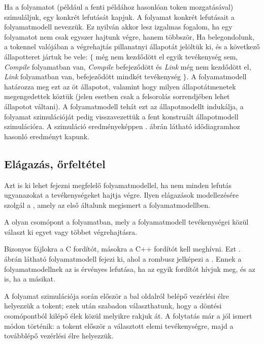 Ha a folyamatot (például a fenti példához hasonlóan token mozgatásával) szimuláljuk, egy konkrét lefutását kapjuk. A folyamat konkrét lefutásait a folyamatmodell  nevezzük. Ez nyilván akkor lesz izgalmas fogalom, ha egy folyamatot nem csak egyszer hajtunk végre, hanem többször,
Ha belegondolunk, a tokennel valójában a végrehajtás pillanatnyi állapotát jelöltük ki, és a következő állapotteret jártuk be vele: $\{$ még nem kezdődött el egyik tevékenység sem, \emph{Compile} folyamatban van, \emph{Compile} befejeződött és \emph{Link} még nem kezdődött el, \emph{Link} folyamatban van, befejeződött mindkét tevékenység $\}$. A folyamatmodell határozza meg ezt az öt állapotot, valamint hogy milyen állapotátmenetek megengedettek köztük (jelen esetben csak a felsorolás sorrendjében lehet állapotot váltani). A folyamatmodell tehát ezt az állapotmodellt indukálja, a folyamat szimulációját pedig visszavezettük a fent konstruált állapotmodell szimulációra. A szimuláció eredményeképpen . ábrán látható idődiagramhoz hasonló eredményt kapunk.



\subsection{Elágazás, őrfeltétel}
Azt is ki lehet fejezni megfelelő folyamatmodellel, ha nem minden lefutás ugyanazokat a tevékenységeket hajtja végre. Ilyen elágazások modellezésére szolgál a , amely az első általunk megismert  a folyamatmodellben.

\begin{definicio}
	A  olyan csomópont a folyamatban, mely a folyamatmodell tevékenységei közül választ ki egyet vagy többet végrehajtásra.
\end{definicio}

\begin{pelda}
Bizonyos fájlokra a C fordítót, másokra a C++ fordítót kell meghívni. Ezt . ábrán látható folyamatmodell fejezi ki, ahol a rombusz jelképezi a . Ennek a folyamatmodellnek az is érvényes lefutása, ha az egyik fordítót hívjuk meg, és az is, ha a másikat.

A folyamat szimulációja során először a bal oldalról belépő vezérlési élre helyezzük a tokent; ezek után szabadon választhatunk, hogy a döntési csomópontból kilépő élek közül melyikre rakjuk át. A folytatás már a jól ismert módon történik: a tokent először a választott elemi tevékenységre, majd a továbblépő vezérlési élre helyezzük. 
\end{pelda}

